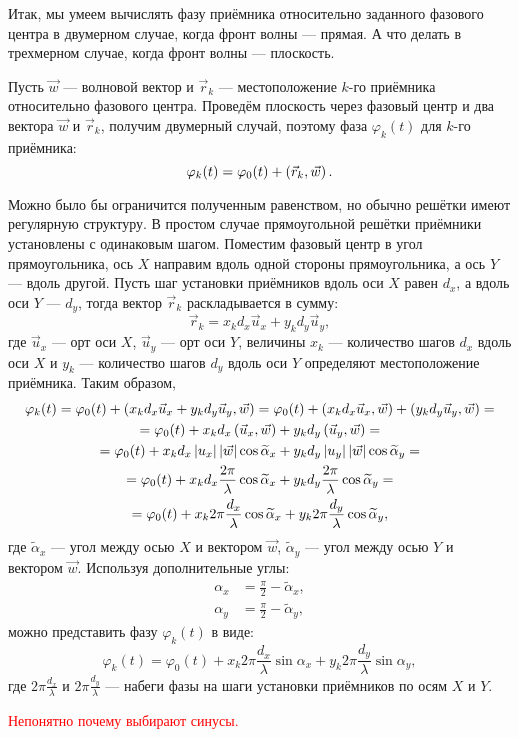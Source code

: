 Итак, мы умеем вычислять фазу приёмника относительно заданного фазового центра в двумерном случае, когда фронт волны --- прямая. А что делать в трехмерном случае, когда фронт
волны --- плоскость.

Пусть $\vec{w}$ --- волновой вектор и $\vec{r}_k$ --- местоположение $k$-го приёмника относительно фазового центра. Проведём плоскость через фазовый центр и два вектора $\vec{w}$
и $\vec{r}_k$, получим двумерный случай, поэтому фаза $\varphi_k(t)$ для $k$-го приёмника:
\[
    \varphi_k(t) = \varphi_0(t) + \left ( \vec{r}_k, \vec{w} \right ) .
\]

Можно было бы ограничится полученным равенством, но обычно решётки имеют регулярную структуру. В простом случае прямоугольной решётки приёмники установлены с одинаковым шагом.
Поместим фазовый центр в угол прямоугольника, ось $X$ направим вдоль одной стороны прямоугольника, а ось $Y$ --- вдоль другой. Пусть шаг установки приёмников вдоль оси $X$
равен $d_x$, а вдоль оси $Y$ --- $d_y$, тогда вектор $\vec{r}_k$ раскладывается в сумму:
\[
    \vec{r}_k = x_k d_x \vec{u}_x + y_k d_y \vec{u}_y,
\]
где $\vec{u}_x$ --- орт оси $X$, $\vec{u}_y$ --- орт оси $Y$, величины $x_k$ --- количество шагов $d_x$ вдоль оси $X$ и $y_k$ --- количество шагов $d_y$ вдоль оси $Y$
определяют местоположение приёмника. Таким образом,
\begin{multline*}
    \varphi_k(t)
    = \varphi_0(t) + \left ( x_k d_x \vec{u}_x + y_k d_y \vec{u}_y, \vec{w} \right )
    = \varphi_0(t) + \left ( x_k d_x \vec{u}_x, \vec{w} \right ) + \left ( y_k d_y \vec{u}_y, \vec{w} \right ) = \\
    = \varphi_0(t) + x_k d_x \left ( \vec{u}_x, \vec{w} \right ) + y_k d_y \left ( \vec{u}_y, \vec{w} \right ) = \\
    = \varphi_0(t) + x_k d_x \left | u_x \right | \left | \vec{w} \right | \cos \widetilde{\alpha}_x + y_k d_y \left | u_y \right | \left | \vec{w} \right | \cos \widetilde{\alpha}_y = \\
    = \varphi_0(t) + x_k d_x \frac{2 \pi}{\lambda} \cos \widetilde{\alpha}_x + y_k d_y \frac{2 \pi}{\lambda} \cos \widetilde{\alpha}_y = \\
    = \varphi_0(t) + x_k 2 \pi \frac{d_x}{\lambda} \cos \widetilde{\alpha}_x + y_k 2 \pi \frac{d_y}{\lambda} \cos \widetilde{\alpha}_y,
\end{multline*}
где $\widetilde{\alpha}_x$ --- угол между осью $X$ и вектором $\vec{w}$, $\widetilde{\alpha}_y$ --- угол между осью $Y$ и вектором $\vec{w}$. Используя дополнительные углы:
\begin{align*}
    \alpha_x & = \frac{\pi}{2} - \widetilde{\alpha}_x, \\
    \alpha_y & = \frac{\pi}{2} - \widetilde{\alpha}_y,
\end{align*}
можно представить фазу $\varphi_k(t)$ в виде:
\[
    \varphi_k(t)
    = \varphi_0(t) + x_k 2 \pi \frac{d_x}{\lambda} \sin \alpha_x + y_k 2 \pi \frac{d_y}{\lambda} \sin \alpha_y ,
\]
где $2 \pi \frac{d_x}{\lambda}$ и $2 \pi \frac{d_y}{\lambda}$ --- набеги фазы на шаги установки приёмников по осям $X$ и $Y$.

\textcolor{red}{Непонятно почему выбирают синусы.}